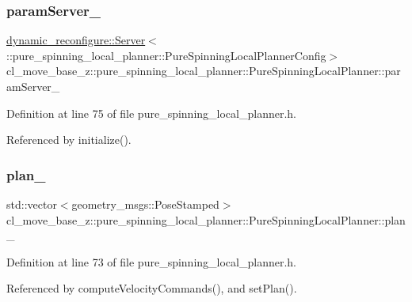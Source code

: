 \subsubsection{\texorpdfstring{param\+Server\+\_\+}{paramServer\_}}
{\footnotesize\ttfamily \hyperlink{strikes__back_2servers_2led__action__server_2src_2led__action__server__node_8cpp_a2036ae39d23f8e14a2cc8ddcd46dea5a}{dynamic\+\_\+reconfigure\+::\+Server}$<$\+::pure\+\_\+spinning\+\_\+local\+\_\+planner\+::\+Pure\+Spinning\+Local\+Planner\+Config$>$ cl\+\_\+move\+\_\+base\+\_\+z\+::pure\+\_\+spinning\+\_\+local\+\_\+planner\+::\+Pure\+Spinning\+Local\+Planner\+::param\+Server\+\_\+\hspace{0.3cm}{\ttfamily [private]}}



Definition at line 75 of file pure\+\_\+spinning\+\_\+local\+\_\+planner.\+h.



Referenced by initialize().

\mbox{\label{classcl__move__base__z_1_1pure__spinning__local__planner_1_1PureSpinningLocalPlanner_a31875ee78bae4698b579e20c0754860d}} 
\subsubsection{\texorpdfstring{plan\+\_\+}{plan\_}}
{\footnotesize\ttfamily std\+::vector$<$geometry\+\_\+msgs\+::\+Pose\+Stamped$>$ cl\+\_\+move\+\_\+base\+\_\+z\+::pure\+\_\+spinning\+\_\+local\+\_\+planner\+::\+Pure\+Spinning\+Local\+Planner\+::plan\+\_\+\hspace{0.3cm}{\ttfamily [private]}}



Definition at line 73 of file pure\+\_\+spinning\+\_\+local\+\_\+planner.\+h.



Referenced by compute\+Velocity\+Commands(), and set\+Plan().

